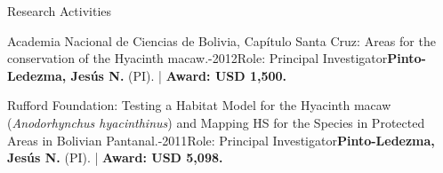 \documentclass{resume} %
\begin{document}
\begin{rSection}{Research Activities}
\begin{pSubsection}{Academia Nacional de Ciencias de Bolivia, Capítulo Santa Cruz: }{\normalfont Areas for the conservation of the Hyacinth macaw.}{-2012}{\normalfont Role: Principal Investigator}{\textbf{Pinto-Ledezma, Jesús N.} \normalfont (PI). | {\bf Award: USD 1,500.}}
\end{pSubsection}

\begin{pSubsection}{Rufford Foundation: }{\normalfont Testing a Habitat Model for the Hyacinth macaw (\emph{Anodorhynchus hyacinthinus}) and Mapping HS for the Species in Protected Areas in Bolivian Pantanal.}{-2011}{\normalfont Role: Principal Investigator}{\textbf{Pinto-Ledezma, Jesús N.} \normalfont (PI). | {\bf Award: USD 5,098.}}
\end{pSubsection}

\end{rSection}

\end{document}
